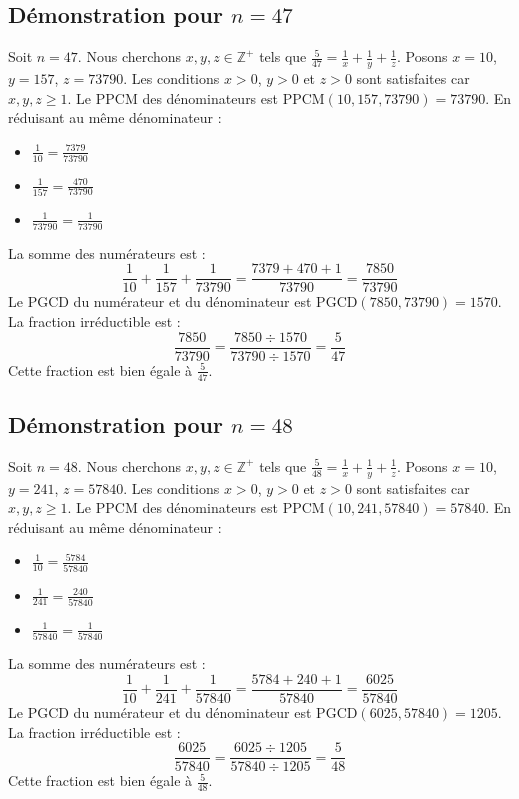 \documentclass[11pt,a4paper]{article}
\begin{document}
\subsection{Démonstration pour $n = 47$}
Soit $n = 47$. Nous cherchons $x, y, z \in \mathbb{Z}^{+}$ tels que $\frac{5}{47} = \frac{1}{x} + \frac{1}{y} + \frac{1}{z}$.
Posons $x = 10$, $y = 157$, $z = 73790$.
Les conditions $x > 0$, $y > 0$ et $z > 0$ sont satisfaites car $x, y, z \geq 1$.
Le PPCM des dénominateurs est $\text{PPCM}(10, 157, 73790) = 73790$.
En réduisant au même dénominateur :
\begin{itemize}
    \item $\frac{1}{10} = \frac{7379}{73790}$
    \item $\frac{1}{157} = \frac{470}{73790}$
    \item $\frac{1}{73790} = \frac{1}{73790}$
\end{itemize}
La somme des numérateurs est :
$$ \frac{1}{10} + \frac{1}{157} + \frac{1}{73790} = \frac{7379 + 470 + 1}{73790} = \frac{7850}{73790} $$
Le PGCD du numérateur et du dénominateur est $\text{PGCD}(7850, 73790) = 1570$.
La fraction irréductible est :
$$ \frac{7850}{73790} = \frac{7850 \div 1570}{73790 \div 1570} = \frac{5}{47} $$
Cette fraction est bien égale à $\frac{5}{47}$.

\subsection{Démonstration pour $n = 48$}
Soit $n = 48$. Nous cherchons $x, y, z \in \mathbb{Z}^{+}$ tels que $\frac{5}{48} = \frac{1}{x} + \frac{1}{y} + \frac{1}{z}$.
Posons $x = 10$, $y = 241$, $z = 57840$.
Les conditions $x > 0$, $y > 0$ et $z > 0$ sont satisfaites car $x, y, z \geq 1$.
Le PPCM des dénominateurs est $\text{PPCM}(10, 241, 57840) = 57840$.
En réduisant au même dénominateur :
\begin{itemize}
    \item $\frac{1}{10} = \frac{5784}{57840}$
    \item $\frac{1}{241} = \frac{240}{57840}$
    \item $\frac{1}{57840} = \frac{1}{57840}$
\end{itemize}
La somme des numérateurs est :
$$ \frac{1}{10} + \frac{1}{241} + \frac{1}{57840} = \frac{5784 + 240 + 1}{57840} = \frac{6025}{57840} $$
Le PGCD du numérateur et du dénominateur est $\text{PGCD}(6025, 57840) = 1205$.
La fraction irréductible est :
$$ \frac{6025}{57840} = \frac{6025 \div 1205}{57840 \div 1205} = \frac{5}{48} $$
Cette fraction est bien égale à $\frac{5}{48}$.
\end{document}
